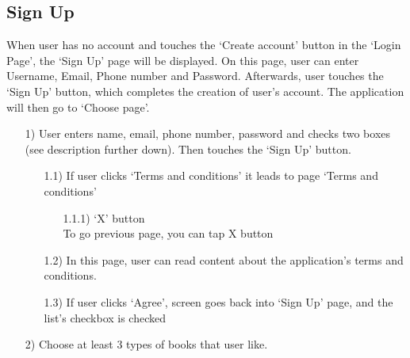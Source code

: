 \documentclass[conference]{IEEEtran}
\begin{document}
\subsection{Sign Up}
When user has no account and touches the ‘Create account’ button in the ‘Login Page’, the ‘Sign Up’ page will be displayed. On this page, user can enter Username, Email, Phone number and Password. Afterwards, user touches the ‘Sign Up’ button, which completes the creation of user’s account. The application will then go to ‘Choose page’.
\begin{itemize}
    \item[1)] User enters name, email, phone number, password and checks two boxes (see description further down). Then touches the ‘Sign Up’ button.
    \begin{itemize}
        \begin{itemize}
            \item User name\\
            Type name.
            \item Email \\
            Type email.
            \item Phone Number \\
            Type phone number.
            \item Password \\
            Type password.
            \item The two checkboxes \\
            ▢ ‘Agree to terms and conditions’ \\
            ▢ ‘Agree to receive newsletter and other promotional content’
            \item ‘Terms and conditions’ \\
            ‘Accept terms and conditions’ checkbox. User can touch ‘Read terms and conditions’ or mark the checkbox in acceptance of the terms and conditions. This means that they have read and agree to the terms and conditions for making a profile in the BookMark application.
        \end{itemize}
        \item[1.1)] If user clicks ‘Terms and conditions’ it leads to page ‘Terms and conditions’ 
        \begin{itemize}
            \item[1.1.1)] ‘X’ button \\
		    To go previous page, you can tap X button
        \end{itemize}
        \item[1.2)] In this page, user can read content about the application’s terms and conditions.
        \item[1.3)] If user clicks ‘Agree’, screen goes back into ‘Sign Up’ page, and the list’s checkbox is checked
    \end{itemize}
    \item[2)] Choose at least 3 types of books that user like.
\end{itemize}
\end{document}
